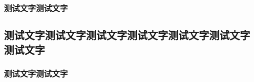 \documentclass[color=BLUE]{textbook-cn}%
\begin{document}
\subsubsection*{测试文字测试文字}
\lipsum[1-2]

\Example{\lipsum[1][1-5]}
\Answer{\lipsum[1][1-4]}
\Answer*{\lipsum[1][1-4]}


\Variety{\lipsum[1][1-5]}
\Answer{\lipsum[1][1-4]}
\Answer*{\lipsum[1][1-4]}


\subsection{测试文字测试文字测试文字测试文字测试文字测试文字测试文字}
\subsubsection*{测试文字测试文字}
\lipsum[1-2]

\Example{\lipsum[1][1-5]}
\Answer{\lipsum[1][1-4]}
\Answer*{\lipsum[1][1-4]}

\Variety{\lipsum[1][1-5]}
\Answer{\lipsum[1][1-4]}
\Answer*{\lipsum[1][1-4]}
\end{document}
